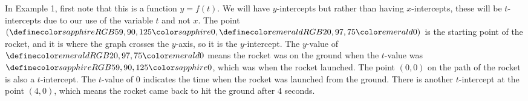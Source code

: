 \documentclass{ximera}
\begin{document}
      In Example 1, first note that this is a function $y=f(t)$. We will have $y$-intercepts but rather than having $x$-intercepts, these will be $t$-intercepts due to our use of the variable $t$ and not $x$.
      The point $(\firsthighlight{0},\secondhighlight{0})$ is the starting point of the rocket,
      and it is where the graph crosses the $y$-axis,
      so it is the $y$-intercept.
      The $y$-value of $\secondhighlight{0}$ means the rocket was on the ground
      when the $t$-value was $\firsthighlight{0}$, which was when the rocket launched.
      The point $(0,0)$ on the path of the rocket is also a $t$-intercept.
      The $t$-value of $0$ indicates the time when the rocket was launched from the ground.
      There is another $t$-intercept at the point $(4,0)$,
      which means the rocket came back to hit the ground after $4$ seconds.
   
\end{document}
